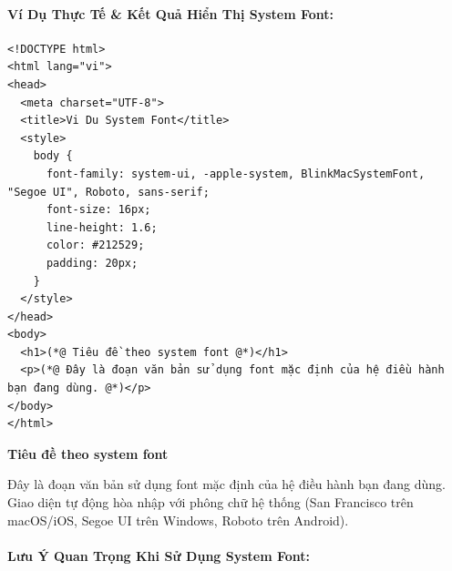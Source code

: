 \documentclass[11pt,oneside]{book}
\begin{document}
\paragraph{Ví Dụ Thực Tế \& Kết Quả Hiển Thị System Font:}

\begin{codeWindow}
\begin{lstlisting}[language=HTML5]
<!DOCTYPE html>
<html lang="vi">
<head>
  <meta charset="UTF-8">
  <title>Vi Du System Font</title>
  <style>
    body {
      font-family: system-ui, -apple-system, BlinkMacSystemFont, "Segoe UI", Roboto, sans-serif;
      font-size: 16px;
      line-height: 1.6;
      color: #212529;
      padding: 20px;
    }
  </style>
</head>
<body>
  <h1>(*@ Tiêu đề theo system font @*)</h1>
  <p>(*@ Đây là đoạn văn bản sử dụng font mặc định của hệ điều hành bạn đang dùng. @*)</p>
</body>
</html>
\end{lstlisting}
\end{codeWindow}

\begin{browserWindow}
\sffamily\small
\begin{tcolorbox}[arc=4pt, colback=white, colframe=primaryBlue!30, boxrule=0.8pt, top=12pt, bottom=12pt, left=14pt, right=14pt]
  {\fontsize{18}{22}\selectfont\bfseries\color{primaryBlue} Tiêu đề theo system font} \par\vspace{6pt}
  {\fontsize{12}{16}\selectfont Đây là đoạn văn bản sử dụng font mặc định của hệ điều hành bạn đang dùng. Giao diện tự động hòa nhập với phông chữ hệ thống (San Francisco trên macOS/iOS, Segoe UI trên Windows, Roboto trên Android).}
\end{tcolorbox}
\end{browserWindow}

\paragraph{Lưu Ý Quan Trọng Khi Sử Dụng System Font:}
\end{document}
